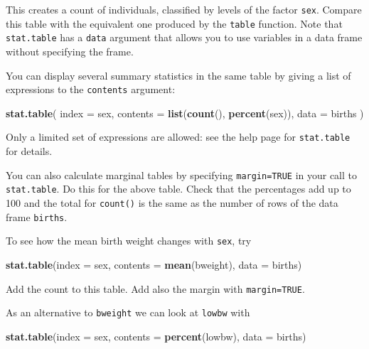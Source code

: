\documentclass[
]{book}
\newenvironment{Shaded}{\begin{snugshade}}{\end{snugshade}}
\newcommand{\AttributeTok}[1]{\textcolor[rgb]{0.13,0.29,0.53}{#1}}
\newcommand{\FunctionTok}[1]{\textcolor[rgb]{0.13,0.29,0.53}{\textbf{#1}}}
\newcommand{\NormalTok}[1]{#1}
\begin{document}
This creates a count of individuals, classified by levels of the
factor \texttt{sex}. Compare this table with the equivalent one produced
by the \texttt{table} function. Note that \texttt{stat.table} has a
\texttt{data} argument that allows you to use variables in a data frame without
specifying the frame.

You can display several summary statistics in the same table by
giving a list of expressions to the \texttt{contents} argument:

\begin{Shaded}
\begin{Highlighting}[]
\FunctionTok{stat.table}\NormalTok{(}
  \AttributeTok{index =}\NormalTok{ sex, }
  \AttributeTok{contents =} \FunctionTok{list}\NormalTok{(}\FunctionTok{count}\NormalTok{(), }\FunctionTok{percent}\NormalTok{(sex)), }
  \AttributeTok{data =}\NormalTok{ births}
\NormalTok{)}
\end{Highlighting}
\end{Shaded}

Only a limited set of expressions are allowed: see the help page
for \texttt{stat.table} for details.

You can also calculate marginal tables by specifying \texttt{margin=TRUE}
in your call to \texttt{stat.table}. Do this for the above table. Check
that the percentages add up to 100 and the total for \texttt{count()} is the
same as the number of rows of the data frame \texttt{births}.

To see how the mean birth weight changes with \texttt{sex}, try

\begin{Shaded}
\begin{Highlighting}[]
\FunctionTok{stat.table}\NormalTok{(}\AttributeTok{index =}\NormalTok{ sex, }\AttributeTok{contents =} \FunctionTok{mean}\NormalTok{(bweight), }\AttributeTok{data =}\NormalTok{ births)}
\end{Highlighting}
\end{Shaded}

Add the count to this table. Add also the margin with \texttt{margin=TRUE}.

As an alternative to \texttt{bweight} we can look at \texttt{lowbw} with

\begin{Shaded}
\begin{Highlighting}[]
\FunctionTok{stat.table}\NormalTok{(}\AttributeTok{index =}\NormalTok{ sex, }\AttributeTok{contents =} \FunctionTok{percent}\NormalTok{(lowbw), }\AttributeTok{data =}\NormalTok{ births)}
\end{Highlighting}
\end{Shaded}
\end{document}

